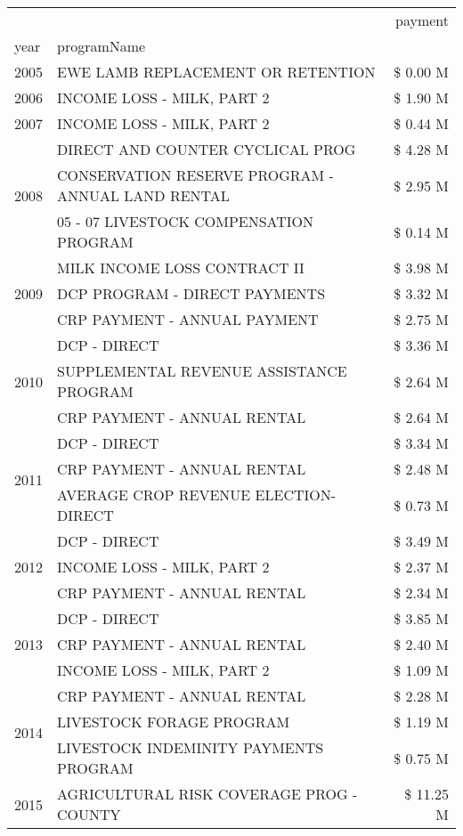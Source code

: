 \begin{tabular}{llr}
\toprule
 &  & payment \\
year & programName &  \\
\midrule
2005 & EWE LAMB REPLACEMENT OR RETENTION & \$ 0.00 M \\
\cline{1-3}
2006 & INCOME LOSS - MILK, PART 2 & \$ 1.90 M \\
\cline{1-3}
2007 & INCOME LOSS - MILK, PART 2 & \$ 0.44 M \\
\cline{1-3}
\multirow[t]{3}{*}{2008} & DIRECT AND COUNTER CYCLICAL PROG & \$ 4.28 M \\
 & CONSERVATION RESERVE PROGRAM - ANNUAL LAND RENTAL & \$ 2.95 M \\
 & 05 - 07 LIVESTOCK COMPENSATION PROGRAM & \$ 0.14 M \\
\cline{1-3}
\multirow[t]{3}{*}{2009} & MILK INCOME LOSS CONTRACT II & \$ 3.98 M \\
 & DCP PROGRAM - DIRECT PAYMENTS & \$ 3.32 M \\
 & CRP PAYMENT - ANNUAL PAYMENT & \$ 2.75 M \\
\cline{1-3}
\multirow[t]{3}{*}{2010} & DCP - DIRECT & \$ 3.36 M \\
 & SUPPLEMENTAL REVENUE ASSISTANCE PROGRAM & \$ 2.64 M \\
 & CRP PAYMENT - ANNUAL RENTAL & \$ 2.64 M \\
\cline{1-3}
\multirow[t]{3}{*}{2011} & DCP - DIRECT & \$ 3.34 M \\
 & CRP PAYMENT - ANNUAL RENTAL & \$ 2.48 M \\
 & AVERAGE CROP REVENUE ELECTION-DIRECT & \$ 0.73 M \\
\cline{1-3}
\multirow[t]{3}{*}{2012} & DCP - DIRECT & \$ 3.49 M \\
 & INCOME LOSS - MILK, PART 2 & \$ 2.37 M \\
 & CRP PAYMENT - ANNUAL RENTAL & \$ 2.34 M \\
\cline{1-3}
\multirow[t]{3}{*}{2013} & DCP - DIRECT & \$ 3.85 M \\
 & CRP PAYMENT - ANNUAL RENTAL & \$ 2.40 M \\
 & INCOME LOSS - MILK, PART 2 & \$ 1.09 M \\
\cline{1-3}
\multirow[t]{3}{*}{2014} & CRP PAYMENT - ANNUAL RENTAL & \$ 2.28 M \\
 & LIVESTOCK FORAGE PROGRAM & \$ 1.19 M \\
 & LIVESTOCK INDEMINITY PAYMENTS PROGRAM & \$ 0.75 M \\
\cline{1-3}
\multirow[t]{3}{*}{2015} & AGRICULTURAL RISK COVERAGE PROG - COUNTY & \$ 11.25 M \\

\end{tabular}
